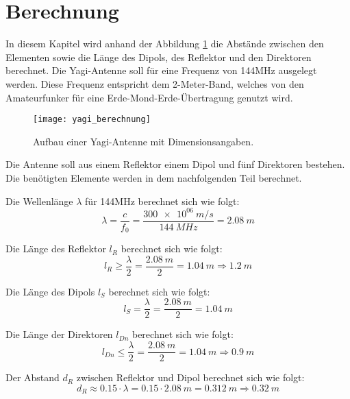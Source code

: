 \section{Berechnung}\label{sec:Berechnung}
In diesem Kapitel wird anhand der Abbildung \ref{fig:berechnung} die Abstände zwischen den Elementen sowie die Länge des Dipols, des Reflektor und den Direktoren berechnet. Die Yagi-Antenne soll für eine Frequenz von 144MHz ausgelegt werden. Diese Frequenz entspricht dem 2-Meter-Band, welches von den Amateurfunker für eine Erde-Mond-Erde-Übertragung genutzt wird.

\begin{figure}[H]
	\centering
	\texttt{[image: yagi\_berechnung]}
	\caption{Aufbau einer Yagi-Antenne mit Dimensionsangaben.}\label{fig:berechnung}
\end{figure}

Die Antenne soll aus einem Reflektor einem Dipol und fünf Direktoren bestehen. Die benötigten Elemente werden in dem nachfolgenden Teil berechnet.

Die Wellenlänge $ \lambda $ für 144MHz berechnet sich wie folgt:
\begin{equation}
\lambda=\frac{c}{f_{0}}=\frac{\SI{300e06}{m/s}}{
\SI{144}{MHz}} = \SI{2.08}{m}
\end{equation}

Die Länge des Reflektor $ l_{R} $ berechnet sich wie folgt:
\begin{equation}
l_{R}\geq\frac{\lambda}{2}=\frac{\SI{2.08}{m}}{
	2} = \SI{1.04}{m} \Rightarrow \SI{1.2}{m}
\end{equation}

Die Länge des Dipols $ l_{S} $ berechnet sich wie folgt:
\begin{equation}
l_{S}=\frac{\lambda}{2}=\frac{\SI{2.08}{m}}{
	2} = \SI{1.04}{m}
\end{equation}

Die Länge der Direktoren $ l_{Dn} $ berechnet sich wie folgt:
\begin{equation}
l_{Dn}\leq\frac{\lambda}{2}=\frac{\SI{2.08}{m}}{
	2} = \SI{1.04}{m} \Rightarrow \SI{0.9}{m}
\end{equation}

Der Abstand $ d_{R} $ zwischen Reflektor und Dipol berechnet sich wie folgt:
\begin{equation}
d_{R}\approx 0.15\cdot\lambda=0.15\cdot \SI{2.08}{m}= \SI{0.312}{m}\Rightarrow \SI{0.32}{m}
\end{equation}

